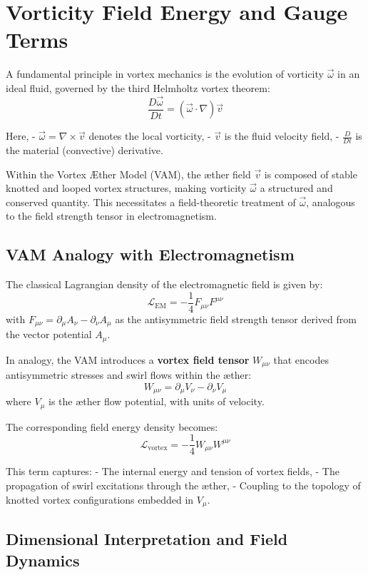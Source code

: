\section{Vorticity Field Energy and Gauge Terms}

A fundamental principle in vortex mechanics is the evolution of vorticity $\vec{\omega}$ in an ideal fluid, governed by the third Helmholtz vortex theorem:
\[
    \frac{D \vec{\omega}}{Dt} = (\vec{\omega} \cdot \nabla) \vec{v}
\]

Here,
- $\vec{\omega} = \nabla \times \vec{v}$ denotes the local vorticity,
- $\vec{v}$ is the fluid velocity field,
- $\frac{D}{Dt}$ is the material (convective) derivative.

Within the Vortex Æther Model (VAM), the æther field $\vec{v}$ is composed of stable knotted and looped vortex structures, making vorticity $\vec{\omega}$ a structured and conserved quantity. This necessitates a field-theoretic treatment of $\vec{\omega}$, analogous to the field strength tensor in electromagnetism.

\subsection*{VAM Analogy with Electromagnetism}

The classical Lagrangian density of the electromagnetic field is given by:
\[
    \mathcal{L}_\text{EM} = -\frac{1}{4} F_{\mu\nu} F^{\mu\nu}
\]
with $F_{\mu\nu} = \partial_\mu A_\nu - \partial_\nu A_\mu$ as the antisymmetric field strength tensor derived from the vector potential $A_\mu$.

In analogy, the VAM introduces a \textbf{vortex field tensor} $W_{\mu\nu}$ that encodes antisymmetric stresses and swirl flows within the æther:
\[
    W_{\mu\nu} = \partial_\mu V_\nu - \partial_\nu V_\mu
\]
where $V_\mu$ is the æther flow potential, with units of velocity.

The corresponding field energy density becomes:
\[
    \mathcal{L}_\text{vortex} = -\frac{1}{4} W_{\mu\nu} W^{\mu\nu}
\]

This term captures:
- The internal energy and tension of vortex fields,
- The propagation of swirl excitations through the æther,
- Coupling to the topology of knotted vortex configurations embedded in $V_\mu$.

\subsection*{Dimensional Interpretation and Field Dynamics}

